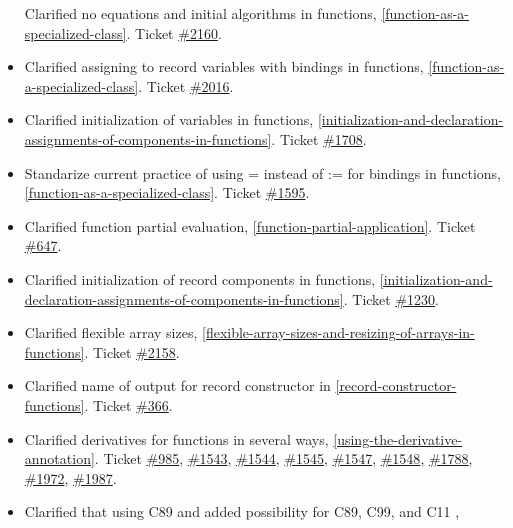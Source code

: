 \documentclass[../MLS.tex]{subfiles}
\begin{document}
\begin{itemize}
  Clarified no equations and initial algorithms in functions, 
  \autoref{function-as-a-specialized-class}. Ticket
  \href{https://trac.modelica.org/Modelica/ticket/2160}{\#2160}.
\item
  Clarified assigning to record variables with bindings in functions,
  \autoref{function-as-a-specialized-class}. Ticket
  \href{https://trac.modelica.org/Modelica/ticket/2016}{\#2016}.
\item
  Clarified initialization of variables in functions, \autoref{initialization-and-declaration-assignments-of-components-in-functions}.
  Ticket \href{https://trac.modelica.org/Modelica/ticket/1708}{\#1708}.
\item
  Standarize current practice of using = instead of := for bindings in
  functions, \autoref{function-as-a-specialized-class}. Ticket
  \href{https://trac.modelica.org/Modelica/ticket/1595}{\#1595}.
\item
  Clarified function partial evaluation, \autoref{function-partial-application}. Ticket
  \href{https://trac.modelica.org/Modelica/ticket/647}{\#647}.
\item
  Clarified initialization of record components in functions, 
  \autoref{initialization-and-declaration-assignments-of-components-in-functions}. Ticket
  \href{https://trac.modelica.org/Modelica/ticket/1230}{\#1230}.
\item
  Clarified flexible array sizes, \autoref{flexible-array-sizes-and-resizing-of-arrays-in-functions}. Ticket
  \href{https://trac.modelica.org/Modelica/ticket/2158}{\#2158}.
\item
  Clarified name of output for record constructor in \autoref{record-constructor-functions}.
  Ticket \href{https://trac.modelica.org/Modelica/ticket/366}{\#366}.
\item
  Clarified derivatives for functions in several ways, \autoref{using-the-derivative-annotation}.
  Ticket \href{https://trac.modelica.org/Modelica/ticket/985}{\#985},
  \href{https://trac.modelica.org/Modelica/ticket/1543}{\#1543},
  \href{https://trac.modelica.org/Modelica/ticket/1544}{\#1544},
  \href{https://trac.modelica.org/Modelica/ticket/1545}{\#1545},
  \href{https://trac.modelica.org/Modelica/ticket/1547}{\#1547},
  \href{https://trac.modelica.org/Modelica/ticket/1548}{\#1548},
  \href{https://trac.modelica.org/Modelica/ticket/1788}{\#1788},
  \href{https://trac.modelica.org/Modelica/ticket/1972}{\#1972},
  \href{https://trac.modelica.org/Modelica/ticket/1987}{\#1987}.
\item
  Clarified that using C89 and added possibility for C89, C99, and C11 ,

\end{itemize}
\end{document}
